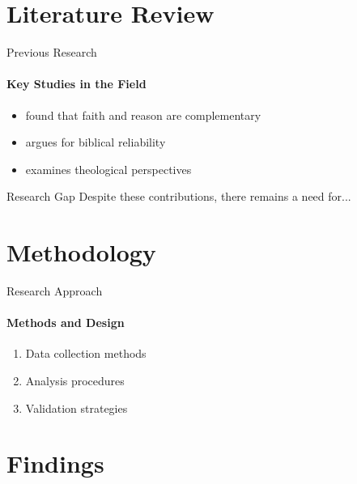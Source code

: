 \documentclass[
  12pt,
  aspectratio=169,  %
  t,                %
  ignorenonframetext %
]{beamer}
\begin{document}
\section{Literature Review}

\begin{frame}{Previous Research}
  \framesubtitle{Key Studies in the Field}
  
  \begin{itemize}
    \item \textcite{smith2020} found that faith and reason are complementary
    \item \textcite{mounce2021} argues for biblical reliability
    \item \textcite{doe2021} examines theological perspectives
  \end{itemize}
  
  \pause
  
  \begin{block}{Research Gap}
    Despite these contributions, there remains a need for...
  \end{block}
  
\end{frame}

\section{Methodology}

\begin{frame}{Research Approach}
  \framesubtitle{Methods and Design}
  
  \begin{enumerate}
    \item Data collection methods
    \item Analysis procedures
    \item Validation strategies
  \end{enumerate}
  
\end{frame}

\section{Findings}
\end{document}
